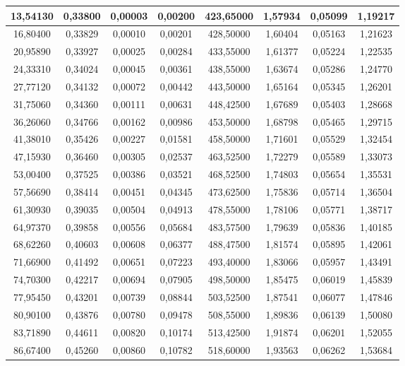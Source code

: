 \documentclass[a4paper,12pt]{article}
\numberwithin{equation}{section}
\begin{document}
\begin{appendices}
\begin{longtable}[c]{|c|c|c|c|c|c|c|c|}
13,54130	&	0,33800	&	0,00003	&	0,00200	&	423,65000	&	1,57934	&	0,05099	&	1,19217	\\\hline
16,80400	&	0,33829	&	0,00010	&	0,00201	&	428,50000	&	1,60404	&	0,05163	&	1,21623	\\\hline
20,95890	&	0,33927	&	0,00025	&	0,00284	&	433,55000	&	1,61377	&	0,05224	&	1,22535	\\\hline
24,33310	&	0,34024	&	0,00045	&	0,00361	&	438,55000	&	1,63674	&	0,05286	&	1,24770	\\\hline
27,77120	&	0,34132	&	0,00072	&	0,00442	&	443,50000	&	1,65164	&	0,05345	&	1,26201	\\\hline
31,75060	&	0,34360	&	0,00111	&	0,00631	&	448,42500	&	1,67689	&	0,05403	&	1,28668	\\\hline
36,26060	&	0,34766	&	0,00162	&	0,00986	&	453,50000	&	1,68798	&	0,05465	&	1,29715	\\\hline
41,38010	&	0,35426	&	0,00227	&	0,01581	&	458,50000	&	1,71601	&	0,05529	&	1,32454	\\\hline
47,15930	&	0,36460	&	0,00305	&	0,02537	&	463,52500	&	1,72279	&	0,05589	&	1,33073	\\\hline
53,00400	&	0,37525	&	0,00386	&	0,03521	&	468,52500	&	1,74803	&	0,05654	&	1,35531	\\\hline
57,56690	&	0,38414	&	0,00451	&	0,04345	&	473,62500	&	1,75836	&	0,05714	&	1,36504	\\\hline
61,30930	&	0,39035	&	0,00504	&	0,04913	&	478,55000	&	1,78106	&	0,05771	&	1,38717	\\\hline
64,97370	&	0,39858	&	0,00556	&	0,05684	&	483,57500	&	1,79639	&	0,05836	&	1,40185	\\\hline
68,62260	&	0,40603	&	0,00608	&	0,06377	&	488,47500	&	1,81574	&	0,05895	&	1,42061	\\\hline
71,66900	&	0,41492	&	0,00651	&	0,07223	&	493,40000	&	1,83066	&	0,05957	&	1,43491	\\\hline
74,70300	&	0,42217	&	0,00694	&	0,07905	&	498,50000	&	1,85475	&	0,06019	&	1,45839	\\\hline
77,95450	&	0,43201	&	0,00739	&	0,08844	&	503,52500	&	1,87541	&	0,06077	&	1,47846	\\\hline
80,90100	&	0,43876	&	0,00780	&	0,09478	&	508,55000	&	1,89836	&	0,06139	&	1,50080	\\\hline
83,71890	&	0,44611	&	0,00820	&	0,10174	&	513,42500	&	1,91874	&	0,06201	&	1,52055	\\\hline
86,67400	&	0,45260	&	0,00860	&	0,10782	&	518,60000	&	1,93563	&	0,06262	&	1,53684	\\\hline

\end{longtable}
\end{appendices}
\end{document}
